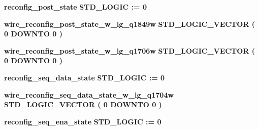 \begin{DoxyCompactItemize}
\item 
{\bf reconfig\+\_\+post\+\_\+state} {\bfseries \textcolor{comment}{S\+T\+D\+\_\+\+L\+O\+G\+IC}\textcolor{vhdlchar}{ }\textcolor{vhdlchar}{ }\textcolor{vhdlchar}{\+:}\textcolor{vhdlchar}{=}\textcolor{vhdlchar}{ }\textcolor{vhdlchar}{ }\textcolor{vhdlchar}{\textquotesingle{}}\textcolor{vhdlchar}{ } \textcolor{vhdldigit}{0} \textcolor{vhdlchar}{ }\textcolor{vhdlchar}{\textquotesingle{}}\textcolor{vhdlchar}{ }} 
\item 
{\bf wire\+\_\+reconfig\+\_\+post\+\_\+state\+\_\+w\+\_\+lg\+\_\+q1849w} {\bfseries \textcolor{comment}{S\+T\+D\+\_\+\+L\+O\+G\+I\+C\+\_\+\+V\+E\+C\+T\+OR}\textcolor{vhdlchar}{ }\textcolor{vhdlchar}{(}\textcolor{vhdlchar}{ }\textcolor{vhdlchar}{ } \textcolor{vhdldigit}{0} \textcolor{vhdlchar}{ }\textcolor{keywordflow}{D\+O\+W\+N\+TO}\textcolor{vhdlchar}{ }\textcolor{vhdlchar}{ } \textcolor{vhdldigit}{0} \textcolor{vhdlchar}{ }\textcolor{vhdlchar}{)}\textcolor{vhdlchar}{ }} 
\item 
{\bf wire\+\_\+reconfig\+\_\+post\+\_\+state\+\_\+w\+\_\+lg\+\_\+q1706w} {\bfseries \textcolor{comment}{S\+T\+D\+\_\+\+L\+O\+G\+I\+C\+\_\+\+V\+E\+C\+T\+OR}\textcolor{vhdlchar}{ }\textcolor{vhdlchar}{(}\textcolor{vhdlchar}{ }\textcolor{vhdlchar}{ } \textcolor{vhdldigit}{0} \textcolor{vhdlchar}{ }\textcolor{keywordflow}{D\+O\+W\+N\+TO}\textcolor{vhdlchar}{ }\textcolor{vhdlchar}{ } \textcolor{vhdldigit}{0} \textcolor{vhdlchar}{ }\textcolor{vhdlchar}{)}\textcolor{vhdlchar}{ }} 
\item 
{\bf reconfig\+\_\+seq\+\_\+data\+\_\+state} {\bfseries \textcolor{comment}{S\+T\+D\+\_\+\+L\+O\+G\+IC}\textcolor{vhdlchar}{ }\textcolor{vhdlchar}{ }\textcolor{vhdlchar}{\+:}\textcolor{vhdlchar}{=}\textcolor{vhdlchar}{ }\textcolor{vhdlchar}{ }\textcolor{vhdlchar}{\textquotesingle{}}\textcolor{vhdlchar}{ } \textcolor{vhdldigit}{0} \textcolor{vhdlchar}{ }\textcolor{vhdlchar}{\textquotesingle{}}\textcolor{vhdlchar}{ }} 
\item 
{\bf wire\+\_\+reconfig\+\_\+seq\+\_\+data\+\_\+state\+\_\+w\+\_\+lg\+\_\+q1704w} {\bfseries \textcolor{comment}{S\+T\+D\+\_\+\+L\+O\+G\+I\+C\+\_\+\+V\+E\+C\+T\+OR}\textcolor{vhdlchar}{ }\textcolor{vhdlchar}{(}\textcolor{vhdlchar}{ }\textcolor{vhdlchar}{ } \textcolor{vhdldigit}{0} \textcolor{vhdlchar}{ }\textcolor{keywordflow}{D\+O\+W\+N\+TO}\textcolor{vhdlchar}{ }\textcolor{vhdlchar}{ } \textcolor{vhdldigit}{0} \textcolor{vhdlchar}{ }\textcolor{vhdlchar}{)}\textcolor{vhdlchar}{ }} 
\item 
{\bf reconfig\+\_\+seq\+\_\+ena\+\_\+state} {\bfseries \textcolor{comment}{S\+T\+D\+\_\+\+L\+O\+G\+IC}\textcolor{vhdlchar}{ }\textcolor{vhdlchar}{ }\textcolor{vhdlchar}{\+:}\textcolor{vhdlchar}{=}\textcolor{vhdlchar}{ }\textcolor{vhdlchar}{ }\textcolor{vhdlchar}{\textquotesingle{}}\textcolor{vhdlchar}{ } \textcolor{vhdldigit}{0} \textcolor{vhdlchar}{ }\textcolor{vhdlchar}{\textquotesingle{}}\textcolor{vhdlchar}{ }} 

\end{DoxyCompactItemize}
